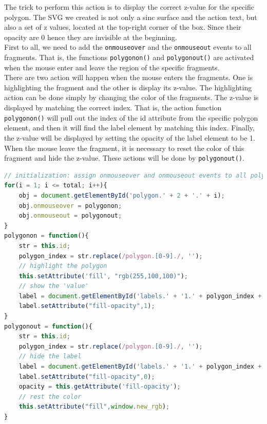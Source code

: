 \documentclass[11pt,twoside]{report}
\begin{document}
The trick to perform this action is to display the correct z-value for the specific polygon. The SVG we created is not only a sinc surface and the action text, but also a set of z values, located at the top-right corner of the box. Since their opacity are 0 hence they are invisible at the beginning.\\

First to all, we need to add the \texttt{onmouseover} and the \texttt{onmouseout} events to all fragments. That is, the functions \texttt{polygonon()} and \texttt{polygonout()} are activated when the mouse enter and leave the region of the specific fragments.\\

There are two action will happen when the mouse enters the fragments. One is highlighting the fragment and the other is display its z-value. The highlighting action can be done simply by changing the color of the fragments. The z-value is displayed by matching the correct index. That is, the action function \texttt{polygonon()} will pull out the index of the id attribute from the specific polygon element, and then it will find the label element by matching this index. Finally, the z-value will be displayed by setting the opacity of the label element to be 1. When the mouse leave the fragment, it is necessary to reset the color of this fragment and hide the z-value. These actions will be done by \texttt{polygonout()}.\\

\begin{lstlisting}[language = JavaScript]
// initialization: assign onmouseover and onmouseout events to all polygons
for(i = 1; i <= total; i++){
    obj = document.getElementById('polygon.' + 2 + '.' + i);
    obj.onmouseover = polygonon;
    obj.onmouseout = polygonout;
}
polygonon = function(){
    str = this.id;
    polygon_index = str.replace(/polygon.[0-9]./, '');
    // highlight the polygon
    this.setAttribute('fill', "rgb(255,100,100)");
    // show the 'value'
    label = document.getElementById('labels.' + '1.' + polygon_index + '.text');
    label.setAttribute("fill-opacity",1);
}
polygonout = function(){
    str = this.id;
    polygon_index = str.replace(/polygon.[0-9]./, '');
    // hide the label
    label = document.getElementById('labels.' + '1.' + polygon_index + '.text');
    label.setAttribute("fill-opacity",0);
    opacity = this.getAttribute('fill-opacity');
    // rest the color
    this.setAttribute("fill",window.new_rgb);
}
\end{lstlisting}
\end{document}
